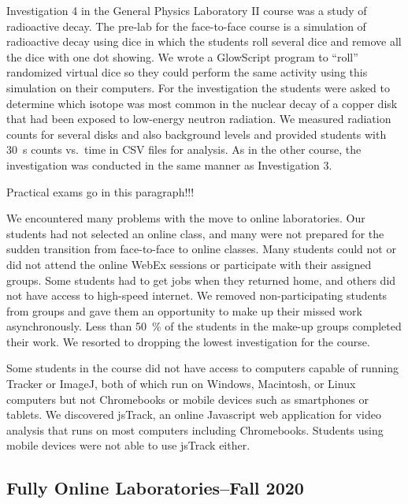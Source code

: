 \documentclass[aip, numerical, preprint]{revtex4-2}
\begin{document}
Investigation 4 in the General Physics Laboratory II course was a study of radioactive
decay. The pre-lab for the face-to-face course is a simulation of radioactive decay using dice
in which the students roll several dice and remove all the dice with one dot showing. We wrote
a GlowScript\citep{glowscript} program to ``roll'' randomized virtual dice so they could
perform the same activity using this simulation on their computers. For the investigation the
students were asked to determine which isotope was most common in the nuclear decay of a copper
disk that had been exposed to low-energy neutron radiation. We measured radiation counts for
several disks and also background levels and provided students with \SI{30}{s} counts vs.\ time
in CSV files for analysis. As in the other course, the investigation was conducted in the same
manner as Investigation 3.


Practical exams go in this paragraph!!!

We encountered many problems with the move to online laboratories. Our students had not
selected an online class, and many were not prepared for the sudden transition from
face-to-face to online classes. Many students could not or did not attend the online WebEx
sessions or participate with their assigned groups. Some students had to get jobs when they
returned home, and others did not have access to high-speed internet. We removed
non-participating students from groups and gave them an opportunity to make up their missed
work asynchronously. Less than \SI{50}{\percent} of the students in the make-up groups
completed their work. We resorted to dropping the lowest investigation for the course.

Some students in the course did not have access to computers capable of running Tracker or
ImageJ, both of which run on Windows, Macintosh, or Linux computers but not Chromebooks or
mobile devices such as smartphones or tablets. We discovered jsTrack\citep{jstrack}, an online
Javascript web application for video analysis that runs on most computers including
Chromebooks. Students using mobile devices were not able to use jsTrack either.

\subsection{Fully Online Laboratories--Fall 2020}
\end{document}
